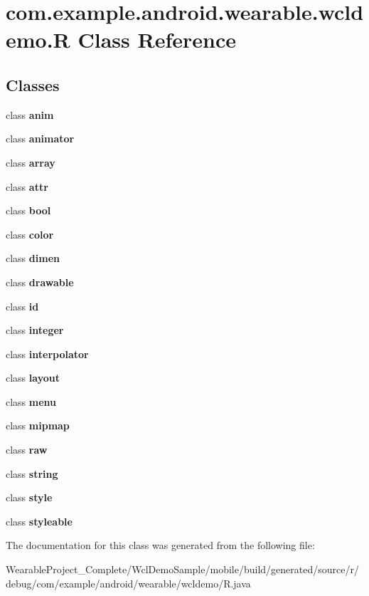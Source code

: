 \hypertarget{classcom_1_1example_1_1android_1_1wearable_1_1wcldemo_1_1R}{}\section{com.\+example.\+android.\+wearable.\+wcldemo.\+R Class Reference}
\label{classcom_1_1example_1_1android_1_1wearable_1_1wcldemo_1_1R}
\subsection*{Classes}
\begin{DoxyCompactItemize}
\item 
class {\bfseries anim}
\item 
class {\bfseries animator}
\item 
class {\bfseries array}
\item 
class {\bfseries attr}
\item 
class {\bfseries bool}
\item 
class {\bfseries color}
\item 
class {\bfseries dimen}
\item 
class {\bfseries drawable}
\item 
class {\bfseries id}
\item 
class {\bfseries integer}
\item 
class {\bfseries interpolator}
\item 
class {\bfseries layout}
\item 
class {\bfseries menu}
\item 
class {\bfseries mipmap}
\item 
class {\bfseries raw}
\item 
class {\bfseries string}
\item 
class {\bfseries style}
\item 
class {\bfseries styleable}
\end{DoxyCompactItemize}


The documentation for this class was generated from the following file\+:\begin{DoxyCompactItemize}
\item 
Wearable\+Project\+\_\+\+Complete/\+Wcl\+Demo\+Sample/mobile/build/generated/source/r/debug/com/example/android/wearable/wcldemo/R.\+java\end{DoxyCompactItemize}
